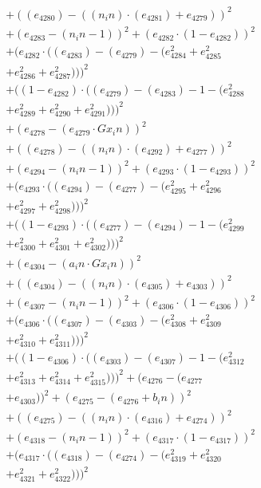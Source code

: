 \documentclass[10pt, a4paper]{article}
\begin{document}
\begin{small}
\begin{align*}
& + ((e_{4280}) - ((n_in)  \cdot  (e_{4281}) + e_{4279}))^{2} \\
& + (e_{4283} - (n_in - 1))^{2} + (e_{4282}  \cdot  (1 - e_{4282}))^{2} \\
& + (e_{4282}  \cdot  ((e_{4283}) - (e_{4279}) - (e_{4284}^{2} + e_{4285}^{2} \\
& + e_{4286}^{2} + e_{4287}^{2})))^{2} \\
& + ((1 - e_{4282})  \cdot  ((e_{4279}) - (e_{4283}) - 1 - (e_{4288}^{2} \\
& + e_{4289}^{2} + e_{4290}^{2} + e_{4291}^{2})))^{2} \\
& + (e_{4278} - (e_{4279}  \cdot  Gx_in))^{2} \\
& + ((e_{4278}) - ((n_in)  \cdot  (e_{4292}) + e_{4277}))^{2} \\
& + (e_{4294} - (n_in - 1))^{2} + (e_{4293}  \cdot  (1 - e_{4293}))^{2} \\
& + (e_{4293}  \cdot  ((e_{4294}) - (e_{4277}) - (e_{4295}^{2} + e_{4296}^{2} \\
& + e_{4297}^{2} + e_{4298}^{2})))^{2} \\
& + ((1 - e_{4293})  \cdot  ((e_{4277}) - (e_{4294}) - 1 - (e_{4299}^{2} \\
& + e_{4300}^{2} + e_{4301}^{2} + e_{4302}^{2})))^{2} \\
& + (e_{4304} - (a_in  \cdot  Gx_in))^{2} \\
& + ((e_{4304}) - ((n_in)  \cdot  (e_{4305}) + e_{4303}))^{2} \\
& + (e_{4307} - (n_in - 1))^{2} + (e_{4306}  \cdot  (1 - e_{4306}))^{2} \\
& + (e_{4306}  \cdot  ((e_{4307}) - (e_{4303}) - (e_{4308}^{2} + e_{4309}^{2} \\
& + e_{4310}^{2} + e_{4311}^{2})))^{2} \\
& + ((1 - e_{4306})  \cdot  ((e_{4303}) - (e_{4307}) - 1 - (e_{4312}^{2} \\
& + e_{4313}^{2} + e_{4314}^{2} + e_{4315}^{2})))^{2} + (e_{4276} - (e_{4277} \\
& + e_{4303}))^{2} + (e_{4275} - (e_{4276} + b_in))^{2} \\
& + ((e_{4275}) - ((n_in)  \cdot  (e_{4316}) + e_{4274}))^{2} \\
& + (e_{4318} - (n_in - 1))^{2} + (e_{4317}  \cdot  (1 - e_{4317}))^{2} \\
& + (e_{4317}  \cdot  ((e_{4318}) - (e_{4274}) - (e_{4319}^{2} + e_{4320}^{2} \\
& + e_{4321}^{2} + e_{4322}^{2})))^{2} \\

\end{align*}
\end{small}
\end{document}
